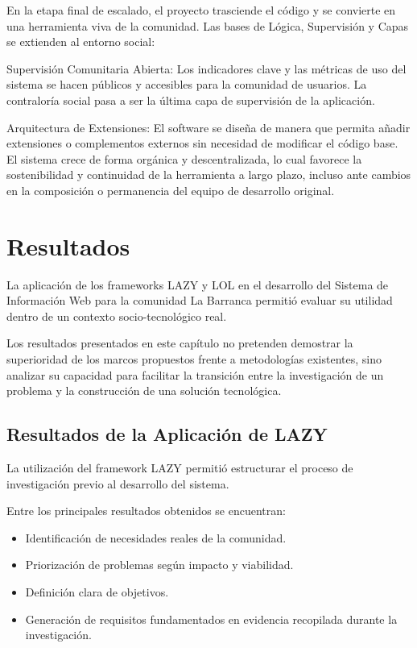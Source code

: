 \documentclass[14pt,a4paper,oneside]{extbook}
\begin{document}
En la etapa final de escalado, el proyecto trasciende el código y se convierte en una herramienta viva de la comunidad. Las bases de Lógica, Supervisión y Capas se extienden al entorno social:

Supervisión Comunitaria Abierta: Los indicadores clave y las métricas de uso del sistema se hacen públicos y accesibles para la comunidad de usuarios. La contraloría social pasa a ser la última capa de supervisión de la aplicación.

Arquitectura de Extensiones: El software se diseña de manera que permita añadir extensiones o complementos externos sin necesidad de modificar el código base. El sistema crece de forma orgánica y descentralizada, lo cual favorece la sostenibilidad y continuidad de la herramienta a largo plazo, incluso ante cambios en la composición o permanencia del equipo de desarrollo original.


\chapter{Resultados}

La aplicación de los frameworks LAZY y LOL en el desarrollo del Sistema de Información Web para la comunidad La Barranca permitió evaluar su utilidad dentro de un contexto socio-tecnológico real.

Los resultados presentados en este capítulo no pretenden demostrar la superioridad de los marcos propuestos frente a metodologías existentes, sino analizar su capacidad para facilitar la transición entre la investigación de un problema y la construcción de una solución tecnológica.

\section{Resultados de la Aplicación de LAZY}

La utilización del framework LAZY permitió estructurar el proceso de investigación previo al desarrollo del sistema.

Entre los principales resultados obtenidos se encuentran:

\begin{itemize}
\item Identificación de necesidades reales de la comunidad.
\item Priorización de problemas según impacto y viabilidad.
\item Definición clara de objetivos.
\item Generación de requisitos fundamentados en evidencia recopilada durante la investigación.
\end{itemize}
\end{document}
